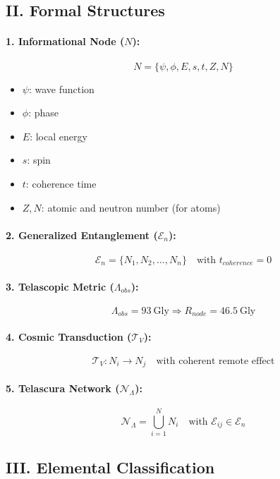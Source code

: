 \documentclass[12pt]{article}
\begin{document}
\subsection*{II. Formal Structures}

\paragraph{1. Informational Node ($N$):}
\[
N = \{\psi, \phi, E, s, t, Z, N\}
\]
\begin{itemize}
    \item $\psi$: wave function
    \item $\phi$: phase
    \item $E$: local energy
    \item $s$: spin
    \item $t$: coherence time
    \item $Z, N$: atomic and neutron number (for atoms)
\end{itemize}

\paragraph{2. Generalized Entanglement ($\mathcal{E}_n$):}
\[
\mathcal{E}_n = \{N_1, N_2, \dots, N_n\} \quad \text{with } t_{coherence} = 0
\]

\paragraph{3. Telascopic Metric ($\Lambda_{obs}$):}
\[
\Lambda_{obs} = 93\ \text{Gly} \Rightarrow R_{node} = 46.5\ \text{Gly}
\]

\paragraph{4. Cosmic Transduction ($\mathcal{T}_V$):}
\[
\mathcal{T}_V: N_i \rightarrow N_j \quad \text{with coherent remote effect}
\]

\paragraph{5. Telascura Network ($\mathcal{N}_\Lambda$):}
\[
\mathcal{N}_\Lambda = \bigcup_{i=1}^{N} N_i \quad \text{with } \mathcal{E}_{ij} \in \mathcal{E}_n
\]

\subsection*{III. Elemental Classification}
\end{document}
